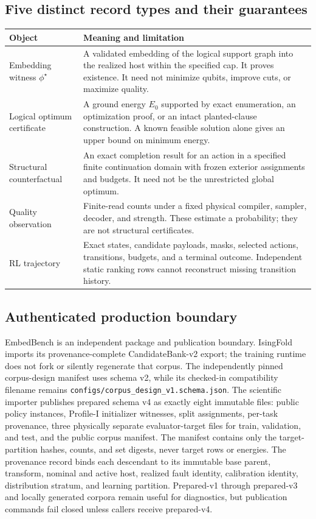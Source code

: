 \documentclass[11pt,a4paper]{article}
\newcommand{\code}[1]{\texttt{\small #1}}
\theoremstyle{definition}\newtheorem{definition}[proposition]{Definition}
\begin{document}
\subsection{Five distinct record types and their guarantees}
\label{data:labels}

{\small
\begin{longtable}{@{}p{}p{}@{}}
\toprule
Object & Meaning and limitation \\
\midrule
\endhead
Embedding witness $\phi^\star$ & A validated embedding of the logical support graph into the realized host within the specified cap. It proves existence. It need not minimize qubits, improve cuts, or maximize quality. \\
Logical optimum certificate & A ground energy $E_0$ supported by exact enumeration, an optimization proof, or an intact planted-clause construction. A known feasible solution alone gives an upper bound on minimum energy. \\
Structural counterfactual & An exact completion result for an action in a specified finite continuation domain with frozen exterior assignments and budgets. It need not be the unrestricted global optimum. \\
Quality observation & Finite-read counts under a fixed physical compiler, sampler, decoder, and strength. These estimate a probability; they are not structural certificates. \\
RL trajectory & Exact states, candidate payloads, masks, selected actions, transitions, budgets, and a terminal outcome. Independent static ranking rows cannot reconstruct missing transition history. \\
\bottomrule
\end{longtable}}

\subsection{Authenticated production boundary}
EmbedBench is an independent package and publication boundary. IsingFold imports its provenance-complete CandidateBank-v2 export; the training runtime does not fork or silently regenerate that corpus. The independently pinned corpus-design manifest uses schema v2, while its checked-in compatibility filename remains \code{configs/corpus\_design\_v1.schema.json}. The scientific importer publishes prepared schema v4 as exactly eight immutable files: public policy instances, Profile-I initializer witnesses, split assignments, per-task provenance, three physically separate evaluator-target files for train, validation, and test, and the public corpus manifest. The manifest contains only the target-partition hashes, counts, and set digests, never target rows or energies. The provenance record binds each descendant to its immutable base parent, transform, nominal and active host, realized fault identity, calibration identity, distribution stratum, and learning partition. Prepared-v1 through prepared-v3 and locally generated corpora remain useful for diagnostics, but publication commands fail closed unless callers receive prepared-v4.
\end{document}
